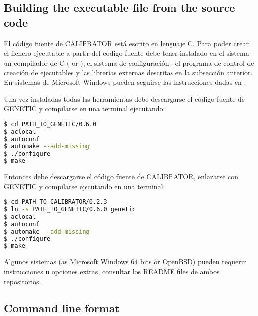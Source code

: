 \documentclass[review,authoryear]{elsarticle}
\begin{document}
\subsection{Building the executable file from the source code}

El código fuente de CALIBRATOR está escrito en lenguaje C. Para poder crear el
fichero ejecutable a partir del código fuente debe tener instalado en el sistema
un compilador de C (\cite{gcc} or \cite{clang}), el sistema de configuración
\cite{automake}, el programa de control de creación de ejecutables
\cite{gnumake} y las librerías externas descritas en la subsección anterior. En
sistemas de Microsoft Windows pueden seguirse las instrucciones dadas en
\cite{mingw-make}.

Una vez instaladas todas las herramientas debe descargarse el código fuente de
GENETIC y compilarse en una terminal ejecutando:
\begin{lstlisting}[language=bash,basicstyle=\scriptsize]
$ cd PATH_TO_GENETIC/0.6.0
$ aclocal
$ autoconf
$ automake --add-missing
$ ./configure
$ make
\end{lstlisting}

Entonces debe descargarse el código fuente de CALIBRATOR, enlazarse con GENETIC
y compilarse ejecutando en una terminal:
\begin{lstlisting}[language=bash,basicstyle=\scriptsize]
$ cd PATH_TO_CALIBRATOR/0.2.3
$ ln -s PATH_TO_GENETIC/0.6.0 genetic
$ aclocal
$ autoconf
$ automake --add-missing
$ ./configure
$ make
\end{lstlisting}

Algunos sistemas (as Microsoft Windows 64 bits or OpenBSD) pueden requerir
instrucciones u opciones extras, consultar los README files de ambos
repositorios.

\subsection{Command line format}
\end{document}
